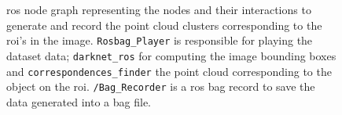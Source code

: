 \begin{landscape}
\begin{figure}[!ht]
	\centering
	\def\svgwidth{\columnwidth}
	\graphicspath{{img/lidar-interference/human/}}
	
	\caption[\acs{ros} node graph to implement the \acsp{roi} recording for later analysis.]{\ac{ros} node graph representing the nodes and their interactions to generate and record the point cloud clusters corresponding to the \ac{roi}'s in the image. \texttt{Rosbag\_Player} is responsible for playing the dataset data; \texttt{darknet\_ros} for computing the image bounding boxes and \texttt{correspondences\_finder} the point cloud corresponding to the object on the \ac{roi}. \texttt{/Bag\_Recorder} is a \ac{ros} bag record to save the data generated into a bag file.}
	\label{fig:human-roi-generation}
\end{figure}


	
\end{landscape} 
